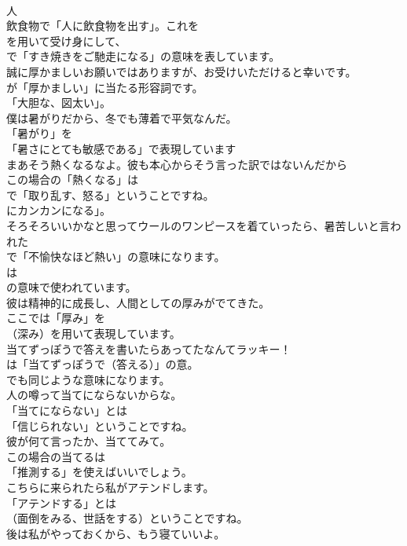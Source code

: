 \documentclass[8pt]{extreport}
\begin{document}
\begin{CJK}{UTF8}{min}
\\	人
\\	飲食物で「人に飲食物を出す」。これを
\\	を用いて受け身にして、
\\	で「すき焼きをご馳走になる」の意味を表しています。	
\\	誠に厚かましいお願いではありますが、お受けいただけると幸いです。 
\\	が「厚かましい」に当たる形容詞です。
\\	「大胆な、図太い」。	
\\	僕は暑がりだから、冬でも薄着で平気なんだ。 
\\	「暑がり」を
\\	「暑さにとても敏感である」で表現しています	
\\	まあそう熱くなるなよ。彼も本心からそう言った訳ではないんだから 
\\	この場合の「熱くなる」は
\\	で「取り乱す、怒る」ということですね。
\\	にカンカンになる」。	
\\	そろそろいいかなと思ってウールのワンピースを着ていったら、暑苦しいと言われた 
\\	で「不愉快なほど熱い」の意味になります。
\\	は
\\	の意味で使われています。	
\\	彼は精神的に成長し、人間としての厚みがでてきた。 
\\	ここでは「厚み」を 
\\	（深み）を用いて表現しています。	
\\	当てずっぽうで答えを書いたらあってたなんてラッキー！ 
\\	は「当てずっぽうで（答える）」の意。
\\	でも同じような意味になります。	
\\	人の噂って当てにならないからな。 
\\	「当てにならない」とは
\\	「信じられない」ということですね。	
\\	彼が何て言ったか、当ててみて。 
\\	この場合の当てるは
\\	「推測する」を使えばいいでしょう。	
\\	こちらに来られたら私がアテンドします。 
\\	「アテンドする」とは 
\\	（面倒をみる、世話をする）ということですね。	
\\	後は私がやっておくから、もう寝ていいよ。 

\end{CJK}
\end{document}
